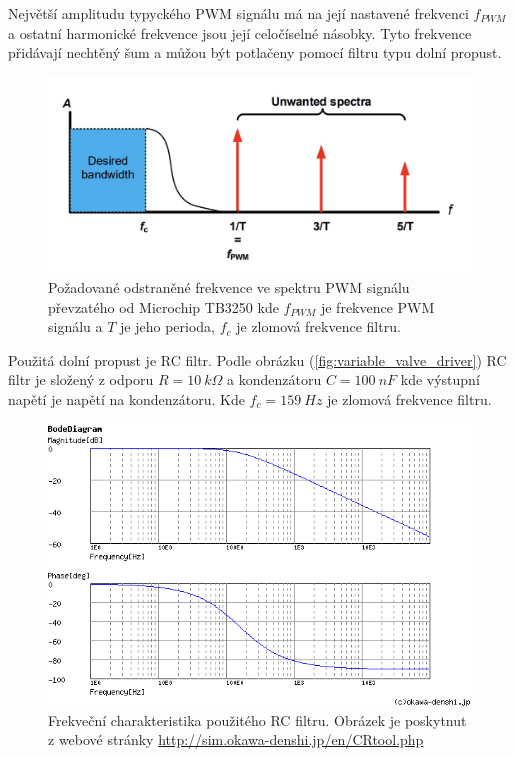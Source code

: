 Největší amplitudu typyckého PWM signálu má na její nastavené frekvenci $f_{PWM}$ a ostatní harmonické frekvence jsou její celočíselné násobky. Tyto frekvence přidávají nechtěný šum a můžou být potlačeny pomocí filtru typu dolní propust.


\begin{figure}[H]
    \centering
    \includegraphics[width=1\linewidth]{pictures/rc_pwm_spectrum_microchip90003250A.jpg}
    \caption{Požadované odstraněné frekvence ve spektru PWM signálu převzatého od Microchip TB3250 kde $f_{PWM}$ je frekvence PWM signálu a $T$ je jeho perioda, $f_{c}$ je zlomová frekvence filtru.}
    \label{fig:unwanted_pwm_spectrum}
\end{figure}

Použitá dolní propust je RC filtr. Podle obrázku (\ref{fig:variable_valve_driver}) RC filtr je složený z odporu $R = 10 \ k\Omega$ a kondenzátoru $C = 100 \ nF$ kde výstupní napětí je napětí na kondenzátoru.
Kde $f_c = 159 \ Hz$ je zlomová frekvence filtru.

\begin{figure}[H]
    \centering
    \includegraphics[width=1\linewidth]{pictures/var_rc_filter.png}
    \caption{Frekveční charakteristika použitého RC filtru. Obrázek je poskytnut z webové stránky \url{http://sim.okawa-denshi.jp/en/CRtool.php}}
    \label{fig:var_rc_filter_char}
\end{figure}

